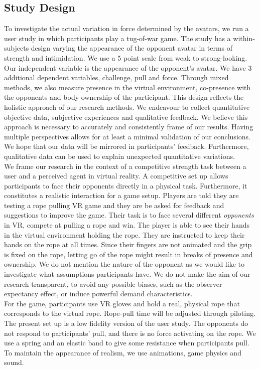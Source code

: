 \subsection{Study Design}
To investigate the actual variation in force determined by the avatars, we run a user study in which participants play a tug-of-war game. The study has a within-subjects design varying the appearance of the opponent avatar in terms of strength and intimidation. We use a 5 point scale from weak to strong-looking. Our independent variable is the appearance of the opponent's avatar. We have 3 additional dependent variables, challenge, pull and force. Through mixed methods, we also measure presence in the virtual environment, co-presence with the opponents and body ownership of the participant. This design reflects the holistic approach of our research methods. We endeavour to collect quantitative objective data, subjective experiences and qualitative feedback. We believe this approach is necessary to accurately and consistently frame of our results. Having multiple perspectives allows for at least a minimal validation of our conclusions. We hope that our data will be mirrored in participants' feedback. Furthermore, qualitative data can be used to explain unexpected quantitative variations.
\\
We frame our research in the context of a competitive strength task between a user and a perceived agent in virtual reality. A competitive set up allows participants to face their opponents directly in a physical task. Furthermore, it constitutes a realistic interaction for a game setup.  Players are told they are testing a rope pulling VR game and they are be asked for feedback and suggestions to improve the game.
Their task is to face several different \textit{opponents} in VR, compete at pulling a rope and win. The player is able to see their hands in the virtual environment holding the rope. They are instructed to keep their hands on the rope at all times. Since their fingers are not animated and the grip is fixed on the rope, letting go of the rope might result in breaks of presence and ownership. We do not mention the nature of the opponent as we would like to investigate what assumptions participants have. We do not make the aim of our research transparent, to avoid any possible biases, such as the observer expectancy effect, or induce powerful demand characteristics.
\\
For the game, participants use VR gloves and hold a real, physical rope that corresponds to the virtual rope. Rope-pull time will be adjusted through piloting. The present set up is a low fidelity version of the user study. The opponents do not respond to participants' pull, and there is no force activating on the rope. We use a spring and an elastic band to give some resistance when participants pull. To maintain the appearance of realism, we use animations, game physics and sound.\\
